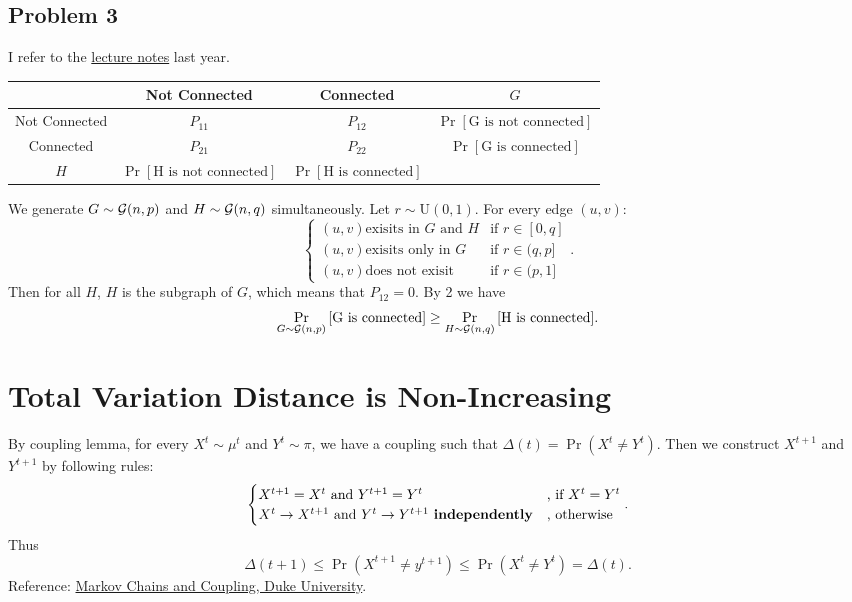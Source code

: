 \documentclass{article}
\begin{document}
\subsection*{Problem 3}
I refer to the \href{http://chihaozhang.com/teaching/SP2021spring/notes/lec5-SP2021Spring.pdf}{lecture notes} last year.

\begin{table}[H]
	\centering
	\begin{tabular}{c|cc|c}
		& Not Connected & Connected & $G$
		\\ \hline
		Not Connected & $P_{11}$ & $P_{12}$ & $\Pr[\mbox{G is not connected}]$
		\\
		Connected & $P_{21}$ & $P_{22}$ & $\Pr[\mbox{G is connected}]$
		\\ \hline
		$H$ & $\Pr[\mbox{H is not connected}]$ & $\Pr[\mbox{H is connected}]$ &
	\end{tabular}
\end{table}

We generate $G\sim\mathcal{G}(n,p)$ and $H\sim\mathcal{G}(n,q)$ simultaneously. Let $r\sim\mathrm{U}(0,1)$. For every edge $(u,v)$:
\[
    \begin{cases}
		(u,v) \mbox{exisits in $G$ and $H$} &\mbox{if }r\in[0,q]
		\\
		(u,v) \mbox{exisits only in $G$} &\mbox{if }r\in(q,p]
		\\
		(u,v) \mbox{does not exisit} &\mbox{if }r\in(p,1]
    \end{cases}
.\]
Then for all $H$,  $H$ is the subgraph of $G$, which means that $P_{12}=0$. By 2 we have 
\[
	\Pr_{G\sim\mathcal{G}(n,p)}\qty[\mbox{G is connected}]\ge\Pr_{H\sim\mathcal{G}(n,q)}\qty[\mbox{H is connected}].
\]

\section{Total Variation Distance is Non-Increasing}

By coupling lemma, for every $X^t\sim\mu^t$ and  $Y^t\sim\pi$, we have a coupling such that  $\Delta(t)=\Pr(X^t\ne Y^t)$. Then we construct $X^{t+1}$ and  $Y^{t+1}$ by following rules:
 \[
	 \begin{cases}
		 X^{t+1}=X^t\mbox{ and }Y^{t+1}=Y^t & \mbox{, if }X^t=Y^t
		 \\
		 X^t\to X^{t+1}\mbox{ and }Y^t\to Y^{t+1} \mbox{ \textbf{independently}} & \mbox{, otherwise}
	 \end{cases}	 
.\] 
Thus
\[
	\Delta(t+1)\le \Pr(X^{t+1}\ne y^{t+1})\le\Pr(X^{t}\ne Y^{t})=\Delta(t)
.\] 
Reference: \href{https://courses.cs.duke.edu/spring13/compsci590.2/slides/lec5.pdf}{Markov Chains and Coupling, Duke University}.
\end{document}
